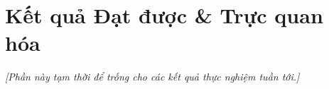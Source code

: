 \section{Kết quả Đạt được \& Trực quan hóa}

\noindent\textit{[Phần này tạm thời để trống cho các kết quả thực nghiệm tuần tới.]}

